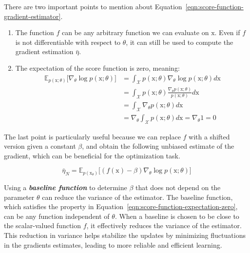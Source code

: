 \noindent There are two important points to mention about Equation~\ref{eqn:score-function-gradient-estimator}.

\begin{enumerate}
    \item The function $f$ can be any arbitrary function we can evaluate on $\mathrm{x}$. Even if $f$ is not differentiable with respect to $\theta$, it can still be used to compute the gradient estimation $\bar{\eta}$.
    \item The expectation of the score function is zero, meaning: 
    \begin{equation}\label{eqn:score-function-expectation-zero}
    \begin{split}
        \mathbb{E}_{p(\mathrm{x};\theta)}\big[\nabla_{\theta}\log p(\mathrm{x};\theta)\big] 
        &= \int_{\mathcal{X}}p(\mathrm{x};\theta)\nabla_{\theta}\log p(\mathrm{x}; \theta) d\mathrm{x} \\
        &= \int_{\mathcal{X}} p(\mathrm{x};\theta)\frac{\nabla_{\theta} p(\mathrm{x}; \theta)}{p(\mathrm{x};\theta)}d\mathrm{x} \\
        &= \int_{\mathcal{X}}\nabla_{\theta}p(\mathrm{x};\theta)d\mathrm{x} \\
        &= \nabla_{\theta}\int_{\mathcal{X}} p(\mathrm{x}; \theta)d\mathrm{x} = \nabla_{\theta} 1 =0
    \end{split}
    \end{equation}
\end{enumerate}

\noindent The last point is particularly useful because we can replace $f$ with a shifted version given a constant $\beta$, and obtain the following unbiased estimate of the gradient, which can be beneficial for the optimization task.

\begin{equation}\label{eqn:score-function-gradient-estimator-baseline}
\bar{\eta}_{N} = \mathbb{E}_{p(\mathrm{x}_{\theta})}\big[(f(\mathrm{x}) - \beta) \nabla_{\theta} \log p(\mathrm{x}; \theta)\big]
\end{equation}

\noindent Using a \textbf{\textit{baseline function}} to determine $\beta$ that does not depend on the parameter $\theta$ can reduce the variance of the 
estimator. The baseline function, which satisfies the property in Equation~\ref{eqn:score-function-expectation-zero}, can be any function independent of
$\theta$. When a baseline is chosen to be close to the scalar-valued function $f$, it effectively reduces the variance of the estimator. This reduction in variance helps stabilize the updates by minimizing fluctuations in the gradients estimates, leading to more reliable and efficient learning.

